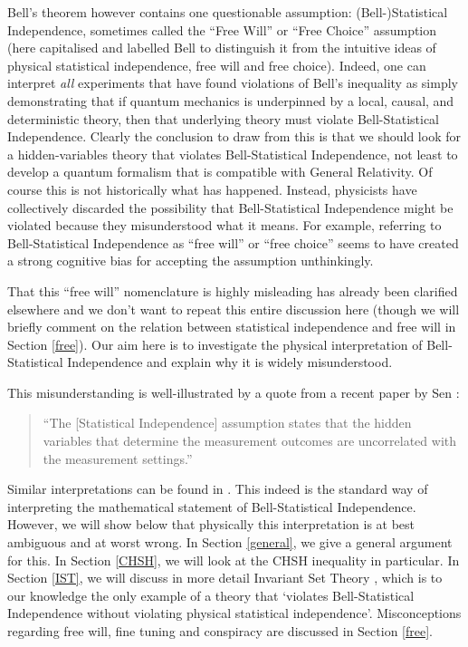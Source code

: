 \documentclass[12pt]{article}
\begin{document}
Bell's theorem however contains one questionable assumption: (Bell-)Statistical Independence, sometimes called the ``Free Will'' or ``Free Choice'' assumption (here capitalised and labelled Bell to distinguish it from the intuitive ideas of physical statistical independence, free will and free  choice).
Indeed, one can interpret \emph{all} experiments that have found violations of Bell's inequality as simply demonstrating that if quantum mechanics is underpinned by a local, causal, and deterministic theory, then that underlying theory must violate Bell-Statistical Independence. Clearly the conclusion to draw from this is that we should look for a hidden-variables theory that violates Bell-Statistical Independence, not least to develop a quantum formalism that is compatible with General Relativity. 
Of course this is not historically what has happened. Instead, physicists have collectively discarded the possibility that Bell-Statistical Independence might be violated because they misunderstood what it means. For example, referring to Bell-Statistical Independence as ``free will'' or ``free choice'' seems to have created a strong cognitive bias for accepting the assumption unthinkingly. 

That this ``free will'' nomenclature is highly misleading has already been clarified elsewhere \cite{Hossenfelder2020Rethinking,Hossenfelder2020SuperdeterminismGuide} and we don't want to repeat this entire discussion here (though we will briefly comment on the relation between statistical independence and free will in Section \ref{free}). Our aim here is to investigate the physical interpretation of Bell-Statistical Independence and explain why it is widely misunderstood. 

This misunderstanding is well-illustrated by a quote from a recent paper by Sen \cite{sen2022analysis}:
\begin{quote}
``The [Statistical Independence] assumption states that the hidden variables that determine the measurement outcomes are uncorrelated with the measurement settings.''
\end{quote}
Similar interpretations can be found in \cite{Sen2020Superdet1,Sen2020Superdet2}. This indeed is the standard way of interpreting the mathematical statement of Bell-Statistical Independence. However, we will show below that physically this interpretation is at best ambiguous and at worst wrong. In Section \ref{general}, we give a general argument for this. In Section \ref{CHSH}, we will look at the {\sc CHSH} inequality in particular. In Section \ref{IST}, we will discuss in more detail Invariant Set Theory \cite{Palmer2020Discretization}, which is to our knowledge the only example of a theory that `violates Bell-Statistical Independence without violating physical statistical independence'. Misconceptions regarding free will, fine tuning and conspiracy are discussed in Section \ref{free}.
\end{document}
